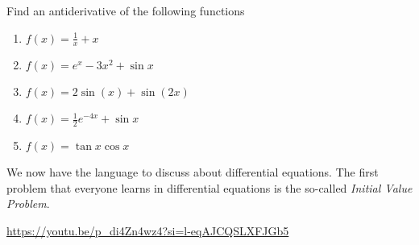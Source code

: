 \documentclass[12pt]{amsart}
\begin{document}
\begin{problem}
Find an antiderivative of the following functions
\begin{enumerate}
	\item $f(x) = \frac{1}{x} + x$
	      \vspace{3cm}
	\item $f(x) = e^x -3x^2 + \sin x$
	      \vspace{3cm}
	\item $f(x) = 2\sin(x) + \sin(2x)$
	      \vspace{3cm}
	\item $f(x) = \frac{1}{2} e^{-4x} + \sin x$
	      \vspace{3cm}
	\item $f(x) = \tan x \cos x$
	      \vspace{3cm}
\end{enumerate}
\end{problem}


\begin{problem}
We now have the language to discuss about differential equations.
The first problem that everyone learns in differential equations is the
so-called \emph{Initial Value Problem}.

\url{https://youtu.be/p_di4Zn4wz4?si=l-eqAJCQSLXFJGb5}
\end{problem}
\end{document}
